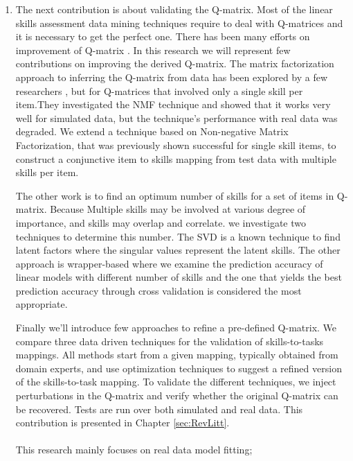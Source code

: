 \begin{enumerate}
\item {} The next contribution is about validating the Q-matrix. Most of the linear skills assessment data mining techniques require to deal with Q-matrices and it is necessary to get the perfect one. There has been many efforts on improvement of Q-matrix \citep{Barnes2005,Desmarais2011b,Winters07}. In this research we will represent few contributions on improving the derived Q-matrix. The matrix factorization approach to inferring the Q-matrix from data has been explored by a few researchers \citep{Barnes2005,Winters07}, but for Q-matrices that involved only a single skill per item.They investigated the \ac{NMF} \citep{Berry2007,Desmarais2011b} technique and showed that it works very well for simulated data, but the technique's performance with real data was degraded. We extend a technique based on Non-negative Matrix Factorization, that was previously shown successful for single skill items, to construct a conjunctive item to skills mapping from test data with multiple skills per item. 

The other work is to find an optimum number of skills for a set of items in Q-matrix. Because Multiple skills may be involved at various degree of importance, and skills may overlap and correlate. we investigate two techniques to determine this number. The \ac{SVD} is a known technique to find latent factors where the singular values represent the latent skills. The other approach is wrapper-based where we examine the prediction accuracy of linear models with different number of skills and the one that yields the best prediction accuracy through cross validation is considered the most appropriate.

Finally we'll introduce few approaches to refine a pre-defined Q-matrix. We compare three data driven techniques for the validation of skills-to-tasks mappings.  All methods start from a given mapping, typically obtained from domain experts, and use optimization techniques to suggest a refined version of the skills-to-task mapping.  To validate the different techniques, we inject perturbations in the Q-matrix and verify whether the original Q-matrix can be recovered. Tests are run over both simulated and real data. This contribution is presented in Chapter \ref{sec:RevLitt}.

\paragraph{}This research mainly focuses on real data model fitting; 

\end{enumerate}

